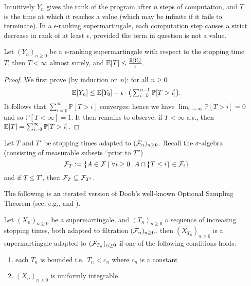 Intuitively $Y_n$ gives the rank of the program after $n$ steps of computation, and $T$ is the time at which it reaches a value (which may be infinite if it fails to terminate).
In a $\epsilon$-ranking supermartingale, each computation step causes a strict decrease in rank of at least $\epsilon$, provided the term in question is not a value.

\begin{lemma}%
\label{lem:rank-PAST}
Let $(Y_n)_{n \geq 0}$ be a $\epsilon$-ranking supermartingale with respect to the stopping time $T$, then $T < \infty$ almost surely, and $\mathbb{E}[T] \leq \frac{\mathbb{E}[Y_0]}{\epsilon}$.
\end{lemma}

\begin{proof}
We first prove (by induction on $n$): for all $n \geq 0$
\[
\mathbb{E}[Y_n] \leq \mathbb{E}[Y_0] - \epsilon \cdot \big(\textstyle\sum_{i=0}^{n-1} \mathbb{P}[T > i]\big).
\]
It follows that $\sum_{i=0}^{\infty} \mathbb{P}[T > i]$ converges; hence we have $\lim_{i \to \infty} \mathbb{P}[T > i] = 0$ and so $\mathbb{P}[T < \infty] = 1$.
It then remains to observe: if $T < \infty$ a.s., then $\mathbb{E}[T] = \sum^\infty_{i=0} \mathbb{P}[T > i]$.
\end{proof}

\begin{remark}
\end{remark}

Let $T$ and $T'$ be stopping times adapted to $(\mathcal{F}_n)_{n \geq 0}$.
Recall the $\sigma$-algebra (consisting of measurable subsets ``prior to $T$'')
\[
\mathcal{F}_T := \{A \in \mathcal{F} \mid \forall i \geq 0 \, . \, A \cap \{T \leq i\} \in \mathcal{F}_i\}
\]
and if $T \leq T'$, then $\mathcal{F}_{T} \subseteq \mathcal{F}_{T'}$.

The following is an iterated version of Doob's well-known Optional Sampling Theorem (see, e.g., \cite[\S 6.7]{AshDD00} and \cite[Thm.~7.2]{DBLP:conf/popl/FioritiH15}).
\begin{theorem}
\label{thm:optional sampling}
Let $(X_n)_{n \geq 0}$ be a supermartingale, and $(T_n)_{n \geq 0}$ a sequence of increasing stopping times, both adapted to filtration $(\mathcal{F}_n)_{n \geq 0}$, then $(X_{T_n})_{n \geq 0}$ is a supermartingale adapted to $(\mathcal{F}_{T_n})_{n \geq 0}$ if one of the following conditions holds:
\begin{enumerate}
\item each $T_n$ is bounded i.e.~$T_n < c_n$ where $c_n$ is a constant
\item $(X_n)_{n \geq 0}$ is uniformly integrable.
\end{enumerate}
\end{theorem}

